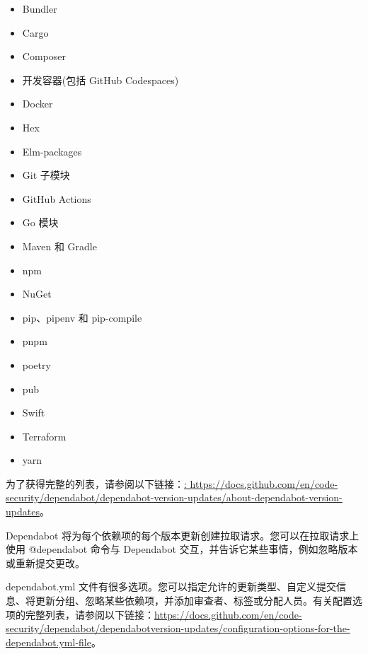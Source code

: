\begin{itemize}
\item 
Bundler

\item 
Cargo

\item 
Composer

\item 
开发容器(包括 GitHub Codespaces)

\item 
Docker

\item 
Hex

\item 
Elm-packages

\item 
Git 子模块

\item 
GitHub Actions

\item 
Go 模块

\item 
Maven 和 Gradle

\item 
npm

\item 
NuGet

\item 
pip、pipenv 和 pip-compile

\item 
pnpm

\item 
poetry

\item 
pub

\item 
Swift

\item 
Terraform

\item 
yarn
\end{itemize}

为了获得完整的列表，请参阅以下链接：\url{: https://docs.github.com/en/code-security/dependabot/dependabot-version-updates/about-dependabot-version-updates}。

Dependabot 将为每个依赖项的每个版本更新创建拉取请求。您可以在拉取请求上使用 @dependabot 命令与 Dependabot 交互，并告诉它某些事情，例如忽略版本或重新提交更改。

dependabot.yml 文件有很多选项。您可以指定允许的更新类型、自定义提交信息、将更新分组、忽略某些依赖项，并添加审查者、标签或分配人员。有关配置选项的完整列表，请参阅以下链接：\url{https://docs.github.com/en/code-security/dependabot/dependabotversion-updates/configuration-options-for-the-dependabot.yml-file}。

